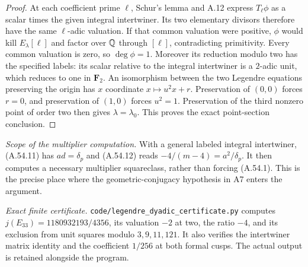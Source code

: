 \begin{proof}
At each coefficient prime $\ell$, Schur's lemma and A.12
express $T_\ell\phi$ as a scalar times the given integral
intertwiner.  Its two elementary divisors therefore have the
same $\ell$-adic valuation.  If that common valuation were
positive, $\phi$ would kill $E_\lambda[\ell]$ and factor over
$\mathbb Q$ through $[\ell]$, contradicting primitivity.  Every
common valuation is zero, so $\deg\phi=1$.  Moreover its
reduction modulo two has the specified labels: its scalar
relative to the integral intertwiner is a $2$-adic unit,
which reduces to one in $\mathbf F_2$.
An isomorphism between the two Legendre equations preserving
the origin has $x$ coordinate $x\mapsto u^2x+r$.
Preservation of $(0,0)$ forces $r=0$, and preservation of
$(1,0)$ forces $u^2=1$.  Preservation of the third nonzero
point of order two then gives $\lambda=\lambda_0$.
This proves the exact point-section conclusion.
\end{proof}

\noindent\emph{Scope of the multiplier computation.}
With a general labeled integral intertwiner, (A.54.11) has
$ad=\delta_p$ and (A.54.12) reads
$-4/(m-4)=a^2/\delta_p$.  It then computes a necessary
multiplier squareclass, rather than forcing (A.54.1).
This is the precise place where the geometric-conjugacy
hypothesis in A7 enters the argument.


\noindent\emph{Exact finite certificate.}
\texttt{code/legendre\_dyadic\_certificate.py} computes
$j(E_{33})=1180932193/4356$, its valuation $-2$ at two,
the ratio $-4$, and its exclusion from unit squares modulo
$3,9,11,121$. It also verifies the intertwiner matrix identity
and the coefficient $1/256$ at both formal cusps.
The actual output is retained alongside the program.
